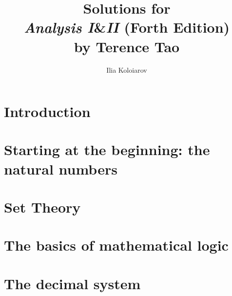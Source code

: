 \documentclass[11pt]{report}
\title{Solutions for\\
\textit{Analysis I}\&\textit{II} (Forth Edition)\\
by Terence Tao}
\author{Ilia Koloiarov}
\begin{document}
\maketitle
\tableofcontents

\chapter{Introduction}

\chapter{Starting at the beginning: the natural numbers}



\chapter{Set Theory}

\appendix
\chapter{The basics of mathematical logic}

\chapter{The decimal system}
\end{document}
